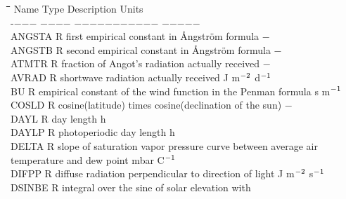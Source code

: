 \begin{tabbing}
\hspace{1.27cm}\=\hspace{1.27cm}\=\hspace{1.27cm}\=\hspace{1.27cm}\=%
\hspace{1.27cm}\=\hspace{1.27cm}\=\hspace{1.27cm}\=\hspace{1.27cm}\=%
\hspace{1.27cm}\=\hspace{1.27cm}\=\kill
Name   \> Type \> Description                                        \> \> \> \> \> \> \> \> Units\\
-$-$$-$$-$   \> \> $-$$-$$-$$-$    \> $-$$-$$-$$-$$-$$-$$-$$-$$-$$-$$-$                                        \> \> \> \> \> \> \> $-$$-$$-$$-$$-$\\
ANGSTA \> \> R   \> first empirical constant in \AA ngstr\"{o}m formula             \> \> \> \> \> \> \> $-$\\
ANGSTB \> \> R   \> second empirical constant in \AA ngstr\"{o}m formula             \> \> \> \> \> \> \> $-$\\
ATMTR   \> \> R   \> fraction of Angot's radiation actually received    \> \> \> \> \> \> \> $-$\\
AVRAD   \> \> R   \> shortwave radiation actually received              \> \> \> \> \> \> \> J m$^{{\rm -2}}$ d$^{{\rm -1}}$\\
BU      \> \> R   \> empirical constant of the wind function in the Penman formula  \> \> \> \> \> \> \> s m$^{{\rm -1}}$  \\
COSLD   \> \> R   \> cosine(latitude) times cosine(declination of the sun)       \> \> \> \> \> \> \> $-$\\
DAYL    \> \> R   \> day length                                         \> \> \> \> \> \> \> h\\
DAYLP   \> \> R   \> photoperiodic day length                           \> \> \> \> \> \> \> h\\
DELTA   \> \> R   \> slope of saturation vapor pressure curve between average air \\
\>\> \> temperature and dew point \> \> \> \> \> \> \> mbar \degrees C$^{{\rm -1}}$\\
DIFPP\> \> R\> diffuse radiation perpendicular to direction of light\> \> \> \> \> \> \> J m$^{{\rm -2}}$ s$^{{\rm -1}}$\\
DSINBE\> \> R  \> integral over the sine of solar elevation with\\
$$
\end{tabbing}
